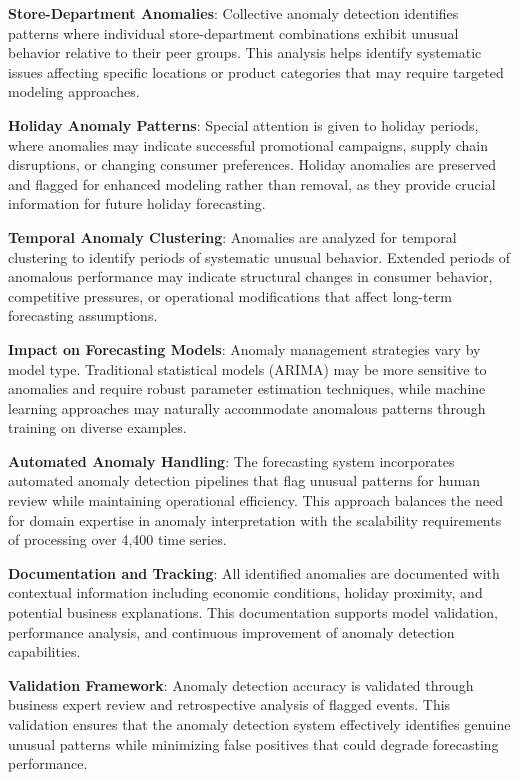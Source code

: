 \textbf{Store-Department Anomalies}: Collective anomaly detection identifies patterns where individual store-department combinations exhibit unusual behavior relative to their peer groups. This analysis helps identify systematic issues affecting specific locations or product categories that may require targeted modeling approaches.

\textbf{Holiday Anomaly Patterns}: Special attention is given to holiday periods, where anomalies may indicate successful promotional campaigns, supply chain disruptions, or changing consumer preferences. Holiday anomalies are preserved and flagged for enhanced modeling rather than removal, as they provide crucial information for future holiday forecasting.

\textbf{Temporal Anomaly Clustering}: Anomalies are analyzed for temporal clustering to identify periods of systematic unusual behavior. Extended periods of anomalous performance may indicate structural changes in consumer behavior, competitive pressures, or operational modifications that affect long-term forecasting assumptions.

\textbf{Impact on Forecasting Models}: Anomaly management strategies vary by model type. Traditional statistical models (ARIMA) may be more sensitive to anomalies and require robust parameter estimation techniques, while machine learning approaches may naturally accommodate anomalous patterns through training on diverse examples.

\textbf{Automated Anomaly Handling}: The forecasting system incorporates automated anomaly detection pipelines that flag unusual patterns for human review while maintaining operational efficiency. This approach balances the need for domain expertise in anomaly interpretation with the scalability requirements of processing over 4,400 time series.

\textbf{Documentation and Tracking}: All identified anomalies are documented with contextual information including economic conditions, holiday proximity, and potential business explanations. This documentation supports model validation, performance analysis, and continuous improvement of anomaly detection capabilities.

\textbf{Validation Framework}: Anomaly detection accuracy is validated through business expert review and retrospective analysis of flagged events. This validation ensures that the anomaly detection system effectively identifies genuine unusual patterns while minimizing false positives that could degrade forecasting performance.

